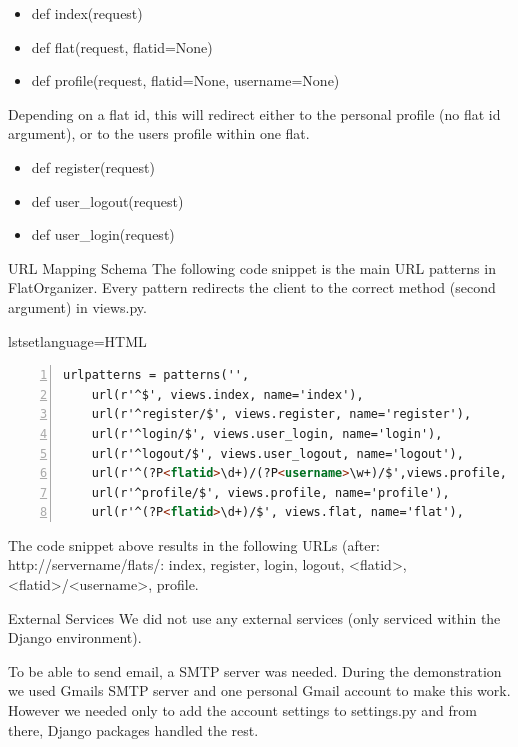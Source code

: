 \documentclass{sig-alt-release2}
\begin{document}
\begin{itemize}
\item def index(request)
\item def flat(request, flatid=None)
\item def profile(request, flatid=None, username=None)
\end{itemize}
Depending on a flat id, this will redirect either to the personal profile (no flat id argument), or to the users profile within one flat.
\begin{itemize}
\item def register(request)
\item def user{\_}logout(request)
\item def user{\_}login(request)
\end{itemize}
URL Mapping Schema
The following code snippet is the main URL patterns in FlatOrganizer. Every pattern redirects the client to the correct method (second argument) in views.py.

lstset{language=HTML} 

\begin{lstlisting}[language=HTML, numbers=left, linewidth=8.5cm, breaklines=true, breakautoindent=true]
urlpatterns = patterns('',
	url(r'^$', views.index, name='index'),
	url(r'^register/$', views.register, name='register'),
	url(r'^login/$', views.user_login, name='login'),
	url(r'^logout/$', views.user_logout, name='logout'),
    url(r'^(?P<flatid>\d+)/(?P<username>\w+)/$',views.profile, name='flatuser'),
	url(r'^profile/$', views.profile, name='profile'),
   	url(r'^(?P<flatid>\d+)/$', views.flat, name='flat'),
\end{lstlisting}



The code snippet above results in the following URLs (after: http://servername/flats/:
index, register, login, logout, <flatid>, <flatid>/<username>, profile.

External Services
We did not use any external services (only serviced within the Django environment).

To be able to send email, a SMTP server was needed. During the demonstration we used Gmails SMTP server and one personal Gmail account to make this work. However we needed only to add the account settings to settings.py and from there, Django packages handled the rest.
\end{document}
